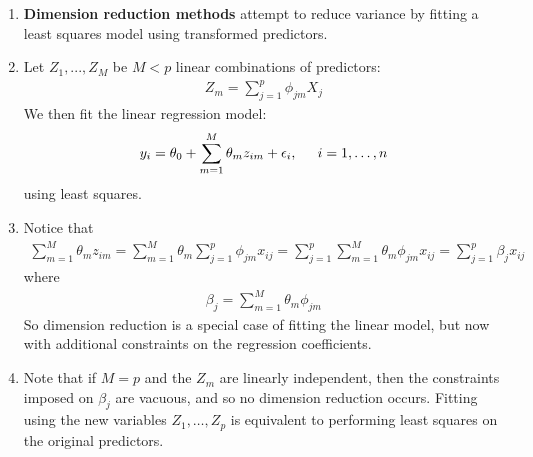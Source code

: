 \documentclass[10pt]{article}
\renewcommand{\th}{\theta}
\begin{document}
\begin{enumerate}
	\item \textbf{Dimension reduction methods} attempt to reduce variance by fitting a least squares model using transformed predictors.
	\item Let $Z_1, ... , Z_M$ be $M < p$ linear combinations of predictors: 
	\begin{align*}
		Z_m = \sum_{j = 1}^p \phi_{jm}X_j 
	\end{align*}
	We then fit the linear regression model:
	\begin{align*}
		y_i = \th_0 + \sum_{m = 1}^M \th_m z_{im} + \epsilon_i, \hspace{.2in} i = 1, \dots, n
	\end{align*}
	using least squares.  
	\item Notice that 
	\begin{align*}
		\sum_{m = 1}^M \th_m z_{im} = \sum_{m = 1}^M \th_m \sum_{j = 1}^p \phi_{jm}x_{ij} = \sum_{j = 1}^p \sum_{m = 1}^M \th_m \phi_{jm}x_{ij} = \sum_{j = 1}^p \beta_j x_{ij} 
	\end{align*}
	where 
	\begin{align*}
		\beta_j = \sum_{m = 1}^M \th_m \phi_{jm}
	\end{align*}
	So dimension reduction is a special case of fitting the linear model, but now with additional constraints on the regression coefficients.
	\item  Note that if $M = p$ and the $Z_m$ are linearly independent, then the constraints imposed on $\beta_j$ are vacuous, and so no dimension reduction occurs.  Fitting using the new variables $Z_1, \dots, Z_p$ is equivalent to performing least squares on the original predictors. 
\end{enumerate}
\end{document}
